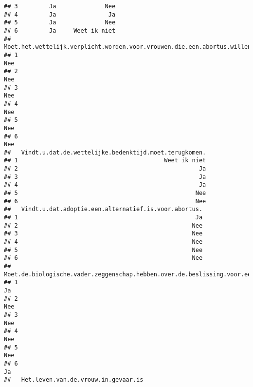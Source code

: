 \documentclass[
]{article}
\begin{document}
\begin{verbatim}
## 3         Ja              Nee
## 4         Ja               Ja
## 5         Ja              Nee
## 6         Ja     Weet ik niet
##   Moet.het.wettelijk.verplicht.worden.voor.vrouwen.die.een.abortus.willen.om.een.echo.van.de.foetus.te.zien.voordat.een.abortus.toegestaan.is.
## 1                                                                                                                                          Nee
## 2                                                                                                                                          Nee
## 3                                                                                                                                          Nee
## 4                                                                                                                                          Nee
## 5                                                                                                                                          Nee
## 6                                                                                                                                          Nee
##   Vindt.u.dat.de.wettelijke.bedenktijd.moet.terugkomen.
## 1                                          Weet ik niet
## 2                                                    Ja
## 3                                                    Ja
## 4                                                    Ja
## 5                                                   Nee
## 6                                                   Nee
##   Vindt.u.dat.adoptie.een.alternatief.is.voor.abortus.
## 1                                                   Ja
## 2                                                  Nee
## 3                                                  Nee
## 4                                                  Nee
## 5                                                  Nee
## 6                                                  Nee
##   Moet.de.biologische.vader.zeggenschap.hebben.over.de.beslissing.voor.een.abortus.
## 1                                                                                Ja
## 2                                                                               Nee
## 3                                                                               Nee
## 4                                                                               Nee
## 5                                                                               Nee
## 6                                                                                Ja
##   Het.leven.van.de.vrouw.in.gevaar.is

\end{verbatim}
\end{document}
